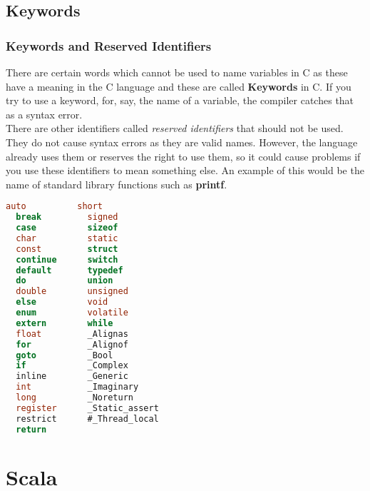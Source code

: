 \documentclass[11pt,a4paper,oneside]{book}
\begin{document}
\chapter{Keywords}
\section{Keywords and Reserved Identifiers}
There are certain words which cannot be used to name variables in C as these
have a meaning in the C language and these are called \textbf{Keywords} in C.
If you try to use a keyword, for, say, the name of a variable, the compiler
catches that as a syntax error.\\

\noindent There are other identifiers called \textit{reserved identifiers} that
should not be used. They do not cause syntax errors as they are valid names. However,
the language already uses them or reserves the right to use them, so it could cause
problems if you use these identifiers to mean something else. An example of this
would be the name of standard library functions such as \textbf{printf}.

\begin{lstlisting}[title=Keywords in C, language=C]
  auto          short
  break         signed
  case          sizeof
  char          static	
  const         struct
  continue      switch
  default       typedef
  do            union
  double        unsigned
  else          void
  enum          volatile
  extern        while
  float         _Alignas
  for           _Alignof
  goto          _Bool
  if            _Complex
  inline        _Generic
  int           _Imaginary
  long          _Noreturn
  register      _Static_assert
  restrict      #_Thread_local
  return
\end{lstlisting}


\part{Scala}
\setcounter{chapter}{0}
\end{document}
